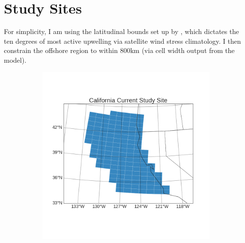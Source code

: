 \documentclass[12pt]{article}
\begin{document}
\section{Study Sites}
For simplicity, I am using the latitudinal bounds set up by \citet{Chavez2009}, which dictates the ten degrees of most active upwelling via satellite wind stress climatology. I then constrain the offshore region to within 800km (via cell width output from the model). 
\clearpage
\begin{figure}[!h]
    \centering
    \begin{subfigure}[b]{0.4\textwidth}
        \centering
        \includegraphics[width=\linewidth]{../../figs/calcs/study-site/california-current-study-site.png}
    \end{subfigure}%
    ~ 
    \begin{subfigure}[b]{0.4\textwidth}
        \centering

\end{subfigure}
\end{figure}
\end{document}

